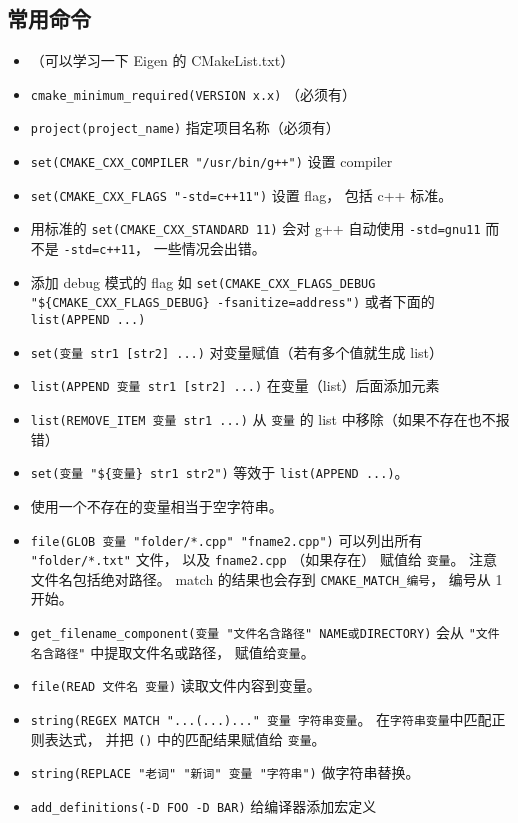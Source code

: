 \subsection{常用命令}
\begin{itemize}
\item （可以学习一下 Eigen 的 CMakeList.txt）
\item \verb`cmake_minimum_required(VERSION x.x)` （必须有）
\item \verb`project(project_name)` 指定项目名称（必须有）
\item \verb|set(CMAKE_CXX_COMPILER "/usr/bin/g++")| 设置 compiler
\item \verb|set(CMAKE_CXX_FLAGS "-std=c++11")| 设置 flag， 包括 c++ 标准。
\item 用标准的 \verb|set(CMAKE_CXX_STANDARD 11)| 会对 g++ 自动使用 \verb|-std=gnu11| 而不是 \verb|-std=c++11|， 一些情况会出错。
\item 添加 debug 模式的 flag 如 \verb|set(CMAKE_CXX_FLAGS_DEBUG "${CMAKE_CXX_FLAGS_DEBUG} -fsanitize=address")| 或者下面的 \verb`list(APPEND ...)`
\item \verb`set(变量 str1 [str2] ...)` 对变量赋值（若有多个值就生成 list）
\item \verb`list(APPEND 变量 str1 [str2] ...)` 在变量（list）后面添加元素
\item \verb|list(REMOVE_ITEM 变量 str1 ...)| 从 \verb|变量| 的 list 中移除（如果不存在也不报错）
\item \verb|set(变量 "${变量} str1 str2")| 等效于 \verb`list(APPEND ...)`。
\item 使用一个不存在的变量相当于空字符串。
\item \verb`file(GLOB 变量 "folder/*.cpp" "fname2.cpp")` 可以列出所有 \verb|"folder/*.txt"| 文件， 以及 \verb|fname2.cpp| （如果存在） 赋值给 \verb|变量|。 注意文件名包括绝对路径。 match 的结果也会存到 \verb|CMAKE_MATCH_编号|， 编号从 1 开始。
\item \verb|get_filename_component(变量 "文件名含路径" NAME或DIRECTORY)| 会从 \verb|"文件名含路径"| 中提取文件名或路径， 赋值给\verb|变量|。
\item \verb|file(READ 文件名 变量)| 读取文件内容到变量。
\item \verb|string(REGEX MATCH "...(...)..." 变量 字符串变量|。 在\verb|字符串变量|中匹配正则表达式， 并把 \verb|()| 中的匹配结果赋值给 \verb|变量|。
\item \verb|string(REPLACE "老词" "新词" 变量 "字符串")| 做字符串替换。
\item \verb|add_definitions(-D FOO -D BAR)| 给编译器添加宏定义

\end{itemize}
